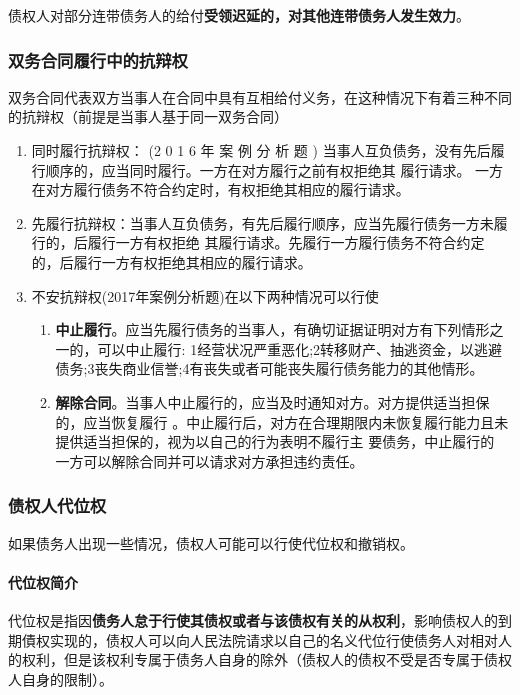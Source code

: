 \documentclass[UTF8,12pt]{ctexart}
\numberwithin{equation}{section} %
\numberwithin{figure}{section}
\numberwithin{table}{section}
\begin{document}
	债权人对部分连带债务人的给付\textbf{受领迟延的，对其他连带债务人发生效力}。
	
	\subsubsection{双务合同履行中的抗辩权}
	双务合同代表双方当事人在合同中具有互相给付义务，在这种情况下有着三种不同的抗辩权（前提是当事人基于同一双务合同）
	\begin{enumerate}
		\item 同时履行抗辩权： (2 0 1 6 年 案 例 分 析 题 ) 当事人互负债务，没有先后履行顺序的，应当同时履行。一方在对方履行之前有权拒绝其 履行请求。 一方在对方履行债务不符合约定时，有权拒绝其相应的履行请求。
		
		\item 先履行抗辩权：当事人互负债务，有先后履行顺序，应当先履行债务一方未履行的，后履行一方有权拒绝 其履行请求。先履行一方履行债务不符合约定的，后履行一方有权拒绝其相应的履行请求。
		
		\item 不安抗辩权(2017年案例分析题)在以下两种情况可以行使
		\begin{enumerate}
			\item \textbf{中止履行}。应当先履行债务的当事人，有确切证据证明对方有下列情形之 一的，可以中止履行: 1经营状况严重恶化;2转移财产、抽逃资金，以逃避债务;3丧失商业信誉;4有丧失或者可能丧失履行债务能力的其他情形。
			
			\item \textbf{解除合同}。当事人中止履行的，应当及时通知对方。对方提供适当担保的，应当恢复履行 。中止履行后，对方在合理期限内未恢复履行能力且未提供适当担保的，视为以自己的行为表明不履行主 要债务，中止履行的 一方可以解除合同并可以请求对方承担违约责任。
		\end{enumerate}
	\end{enumerate}
	
	
	
	\subsubsection{债权人代位权}
	如果债务人出现一些情况，债权人可能可以行使代位权和撤销权。
	
	\paragraph{代位权简介}代位权是指因\textbf{债务人怠于行使其债权或者与该债权有关的从权利}，影响债权人的到期債权实现的，债权人可以向人民法院请求以自己的名义代位行使债务人对相对人的权利，但是该权利专属于债务人自身的除外（债权人的债权不受是否专属于债权人自身的限制）。
	
\end{document}
